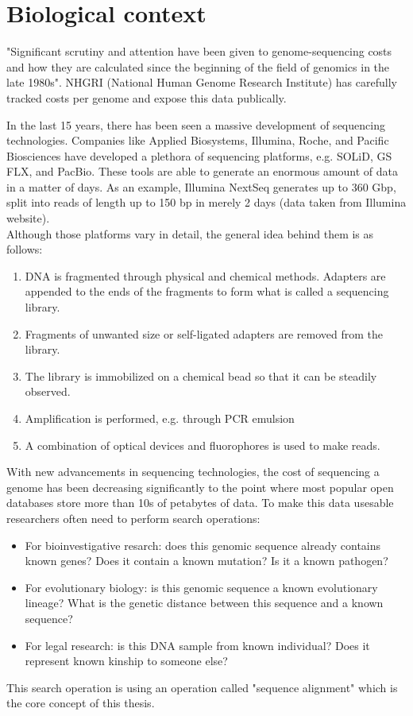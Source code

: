 \section{Biological context}
\label{sec:biology-sequences}

"Significant scrutiny and attention have been given to genome-sequencing costs and how they are calculated since the beginning of the field of genomics in the late 1980s". \cite{nhgri_sequencing_cost_2026}
NHGRI (National Human Genome Research Institute) has carefully tracked costs per genome and expose this data publically.


In the last 15 years, there has been seen a massive development of sequencing technologies. Companies like Applied Biosystems, Illumina, Roche, and Pacific Biosciences have developed a plethora of sequencing platforms, e.g. SOLiD, GS FLX, and PacBio. These tools are able to generate an enormous amount of data in a matter of days. As an example, Illumina NextSeq generates up to 360 Gbp, split into reads of length up to 150 bp in merely 2 days (data taken from Illumina website). \\
 
\noindent Although those platforms vary in detail, the general idea behind them is as follows:
\begin{enumerate}
\item DNA is fragmented through physical and chemical methods. Adapters are appended to the ends of the fragments to form what is called a sequencing library.
\item Fragments of unwanted size or self-ligated adapters are removed from the library.
\item The library is immobilized on a chemical bead so that it can be steadily observed.
\item Amplification is performed, e.g. through PCR emulsion
\item A combination of optical devices and fluorophores is used to make reads.
\end{enumerate}

With new advancements in sequencing technologies, the cost of sequencing a genome has been decreasing significantly to the point where most popular open databases store more than 10s of petabytes of data.
To make this data usesable researchers often need to perform search operations:
\begin{itemize}
\item For bioinvestigative resarch: does this genomic sequence already contains known genes? Does it contain a known mutation? Is it a known pathogen?
\item For evolutionary biology: is this genomic sequence a known evolutionary lineage? What is the genetic distance between this sequence and a known sequence?
\item For legal research: is this DNA sample from known individual? Does it represent known kinship to someone else?
\end{itemize}
This search operation is using an operation called "sequence alignment" which is the core concept of this thesis.


